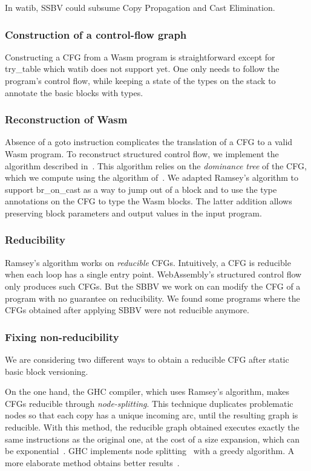 \documentclass[a4paper,11pt]{article}
\begin{document}
In \textsf{watib}, SSBV could subsume Copy Propagation and Cast Elimination.

\subsubsection{Construction of a control-flow graph}
Constructing a CFG from a Wasm program is straightforward except for
\textsf{try\_table} which \textsf{watib} does not support yet. One only needs to
follow the program's control flow, while keeping a state of the types on the
stack to annotate the basic blocks with types.

\subsubsection{Reconstruction of Wasm}
Absence of a goto instruction complicates the translation of a CFG to a valid
Wasm program. To reconstruct structured control flow, we implement the algorithm
described in~\cite{ramsey2022beyond}. This algorithm relies on the
\emph{dominance tree} of the CFG, which we compute using the algorithm
of~\cite{cooper2001simple}. We adapted Ramsey's algorithm to support
\textsf{br\_on\_cast} as a way to jump out of a block and to use the type
annotations on the CFG to type the Wasm blocks. The latter addition allows
preserving block parameters and output values in the input program.

\subsubsection{Reducibility}
Ramsey's algorithm works on \emph{reducible} CFGs. Intuitively, a CFG is
reducible when each loop has a single entry point. WebAssembly's structured
control flow only produces such CFGs. But the SBBV we work on can modify the CFG
of a program with no guarantee on reducibility. We found some programs where the
CFGs obtained after applying SBBV were not reducible anymore.

\subsubsection{Fixing non-reducibility}
We are considering two different ways to obtain a reducible CFG after static
basic block versioning.

On the one hand, the GHC compiler, which uses Ramsey's algorithm, makes CFGs
reducible through \emph{node-splitting}. This technique duplicates problematic
nodes so that each copy has a unique incoming arc, until the resulting graph
is reducible. With this method, the reducible graph obtained executes exactly
the same instructions as the original one, at the cost of a size expansion,
which can be exponential~\cite{carter2003folklore}. GHC implements node
splitting~\cite[Appendix~A]{ramsey2022beyond} with a greedy algorithm. A more
elaborate method obtains better results~\cite{janssen1997making}.
\end{document}
